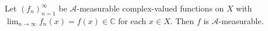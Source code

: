 Let $(f_n)_{n=1}^{\infty}$ be $\mathcal{A}$-measurable complex-valued functions on $X$ with $\lim_{n \to \infty} f_n(x) = f(x) \in \mathbb{C}$ for each $x \in X$. Then $f$ is $\mathcal{A}$-measurable.